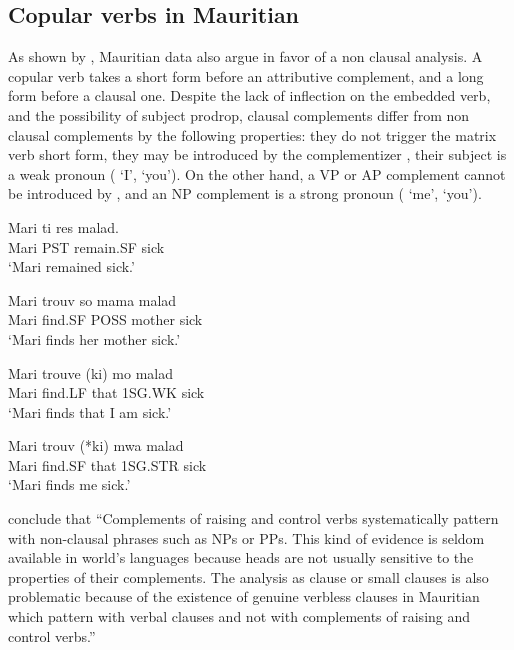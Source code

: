 \documentclass[output=paper]{langsci/langscibook}
\begin{document}
\subsection{Copular verbs in Mauritian}

As shown by \citet{HenriandLaurens2011}, Mauritian data also argue in favor of a non clausal
analysis. A copular verb takes a short form before an attributive complement, and a long form before
a clausal one. Despite the lack of inflection on the embedded verb, and the possibility of subject
prodrop,  clausal complements differ from non clausal complements by the following properties: they
do not trigger the matrix verb short form, they may be introduced by the complementizer ,
their subject is a weak pronoun ( `I',  `you'). On the other hand, a VP or AP complement
cannot be introduced by , and an NP complement is a strong pronoun ( `me',  `you').

\begin{exe}
\ex \begin{xlist}
\ex 
\gll Mari ti res  malad.\\
     Mari PST remain.SF sick\\\hfill\citet[]{HenriandLaurens2011}
\glt `Mari remained sick.'

\ex 
\gll Mari trouv  so mama malad\\
     Mari find.SF POSS mother sick\\
\glt `Mari finds her mother sick.'

\ex 
\gll Mari trouve (ki) mo malad\\
     Mari find.LF that 1SG.WK sick\\
\glt `Mari finds that I am sick.'

\ex 
\gll Mari trouv (*ki) mwa malad\\
     Mari find.SF that 1SG.STR sick\\
\glt `Mari finds me sick.'
\end{xlist}
\end{exe}

\citet[]{HenriandLaurens2011} conclude that ``Complements of raising and control verbs systematically pattern with non-clausal phrases such as NPs or PPs. This kind of evidence is seldom available in world's languages because heads are not usually sensitive to the properties of their complements. The analysis as clause or small clauses is also problematic because of the existence of genuine verbless clauses in Mauritian which pattern with verbal clauses and not with complements of raising and control verbs.''
\end{document}
